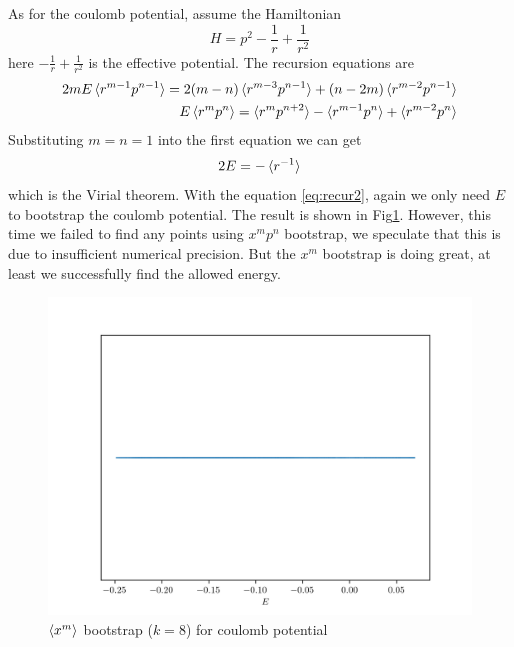 \documentclass[aps, preprint,amsmath, amssymb]{revtex4-2}
\begin{document}
As for the coulomb potential, assume the Hamiltonian
\begin{equation}
    H = p^2 - \frac1r + \frac1{r^2}
\end{equation}
here $- \frac1r + \frac1{r^2}$ is the effective potential. The recursion equations are
\begin{align}
    2mE\braket{r^{m - 1} p^{n - 1}} = 2(m - n)\braket{r^{m - 3} p^{n - 1}} + (n - 2m)\braket{r^{m - 2} p^{n - 1}} \notag \\
    E\braket{r^m p^n} = \braket{r^m p^{n + 2}} - \braket{r^{m - 1} p^n} + \braket{r^{m - 2} p^n}
\end{align}
Substituting $m = n = 1$ into the first equation we can get
\begin{equation}
    2E = -\braket{r^{-1}}
\end{equation}
which is the Virial theorem. With the equation \eqref{eq:recur2}, again we only need $E$ to bootstrap the coulomb potential. The result is shown in Fig\ref{fig:coulomb}. However, this time we failed to find any points using $x^m p^n$ bootstrap, we speculate that this is due to insufficient numerical precision. But the $x^m$ bootstrap is doing great, at least we successfully find the allowed energy.
\begin{figure}
    \includegraphics[width=0.8\linewidth]{coulomb.png}
    \caption{$\braket{x^m}$ bootstrap ($k = 8$) for coulomb potential}
    \label{fig:coulomb}
\end{figure}
\end{document}
